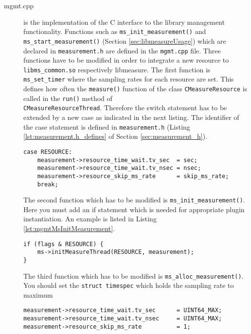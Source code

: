 \begin{description}
\item[mgmt.cpp] is the implementation of the C interface to the library management functionality. Functions such as \texttt{ms\_init\_measurement()} and\\ \texttt{ms\_start\_measurement()} (Section \ref{sec:libmeasureUsage}) which are declared in \texttt{measurement.h} are defined in the \texttt{mgmt.cpp} file. Three functions have to be modified in order to integrate a new resource to \texttt{libms\_common.so} respectively libmeasure. The first function is \texttt{ms\_set\_timer} where the sampling rates for each resource are set. This defines how often the \texttt{measure()} function of the class \texttt{CMeasureResource} is called in the \texttt{run()} method of \\\texttt{CMeasureResourceThread}. Therefore the switch statement has to be extended by a new case as indicated in the next listing. The identifier of the case statement is defined in \texttt{measurement.h} (Listing \ref{lst:measurement.h_defines} of Section \ref{sec:measurement_h}).
\begin{lstlisting}[caption={Code to store resource-specific sampling rates in the \texttt{ms\_set\_timer()} function. \added[id=ck]{Listing aktualisiert}}, label=lst:mgmt]
case RESOURCE:
	measurement->resource_time_wait.tv_sec	= sec;
	measurement->resource_time_wait.tv_nsec	= nsec;
	measurement->resource_skip_ms_rate  	= skip_ms_rate;
	break;
\end{lstlisting}
The second function which has to be modified is \texttt{ms\_init\_measurement()}. Here you must add an if statement which is needed for appropriate plugin instantiation. An example is listed in Listing \ref{lst:mgmtMsInitMeasurement}.
\begin{lstlisting}[caption={Extension of the \texttt{ms\_init\_measurement()} function.}, label=lst:mgmtMsInitMeasurement]
if (flags & RESOURCE) {
	ms->initMeasureThread(RESOURCE, measurement);
}
\end{lstlisting}

The third function which has to be modified is \texttt{ms\_alloc\_measurement()}. You should set the \texttt{struct timespec} which holds the sampling rate to maximum 
\begin{lstlisting}[caption={Extension of the \texttt{ms\_alloc\_measurement()} function.}, label=lst:AlloctoMaxInteger]
measurement->resource_time_wait.tv_sec		= UINT64_MAX;
measurement->resource_time_wait.tv_nsec		= UINT64_MAX;
measurement->resource_skip_ms_rate			= 1;
\end{lstlisting}
\end{description}

